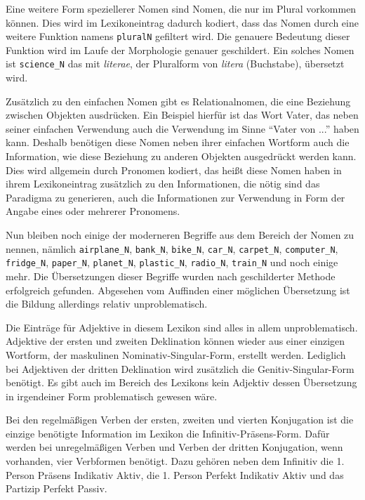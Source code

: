 \documentclass[fontsize=12pt,abstract=on,titlepage,bibliography=totoc,ngerman,listof=totoc]{scrreprt}
\begin{document}
Eine weitere Form speziellerer Nomen sind Nomen, die nur im Plural vorkommen können. Dies wird im Lexikoneintrag dadurch kodiert, dass das Nomen durch eine weitere Funktion namens \texttt{pluralN} gefiltert wird. Die genauere Bedeutung dieser Funktion wird im Laufe der Morphologie genauer geschildert. Ein solches Nomen ist \texttt{science\_N} das mit \textit{literae}, der Pluralform von \textit{litera} (Buchstabe), übersetzt wird. \par
Zusätzlich zu den einfachen Nomen gibt es Relationalnomen, die eine Beziehung zwischen Objekten ausdrücken. Ein Beispiel hierfür ist das Wort Vater, das neben seiner einfachen Verwendung auch die Verwendung im Sinne ``Vater von ...'' haben kann. Deshalb benötigen diese Nomen neben ihrer einfachen Wortform auch die Information, wie diese Beziehung zu anderen Objekten ausgedrückt werden kann. Dies wird allgemein durch Pronomen kodiert, das heißt diese Nomen haben in ihrem Lexikoneintrag zusätzlich zu den Informationen, die nötig sind das Paradigma zu generieren, auch die Informationen zur Verwendung in Form der Angabe eines oder mehrerer Pronomens. \par
Nun bleiben noch einige der moderneren Begriffe aus dem Bereich der Nomen zu nennen, nämlich \texttt{airplane\_N}, \texttt{bank\_N}, \texttt{bike\_N}, \texttt{car\_N}, \texttt{carpet\_N}, \texttt{computer\_N}, \texttt{fridge\_N}, \texttt{paper\_N}, \texttt{planet\_N}, \texttt{plastic\_N}, \texttt{radio\_N}, \texttt{train\_N} und noch einige mehr. Die Übersetzungen dieser Begriffe wurden nach geschilderter Methode erfolgreich gefunden. Abgesehen vom Auffinden einer möglichen Übersetzung ist die Bildung allerdings relativ unproblematisch. \par
Die Einträge für Adjektive in diesem Lexikon sind alles in allem unproblematisch. Adjektive der ersten und zweiten Deklination können wieder aus einer einzigen Wortform, der maskulinen Nominativ-Singular-Form, erstellt werden. Lediglich bei Adjektiven der dritten Deklination wird zusätzlich die Genitiv-Singular-Form benötigt. Es gibt auch im Bereich des Lexikons kein Adjektiv dessen Übersetzung in irgendeiner Form problematisch gewesen wäre. \par
Bei den regelmäßigen Verben der ersten, zweiten und vierten Konjugation ist die einzige benötigte Information im Lexikon die Infinitiv-Präsens-Form. Dafür werden bei unregelmäßigen Verben und Verben der dritten Konjugation, wenn vorhanden, vier Verbformen benötigt. Dazu gehören neben dem Infinitiv die 1. Person Präsens Indikativ Aktiv, die 1. Person Perfekt Indikativ Aktiv und das Partizip Perfekt Passiv. \par
\end{document}
